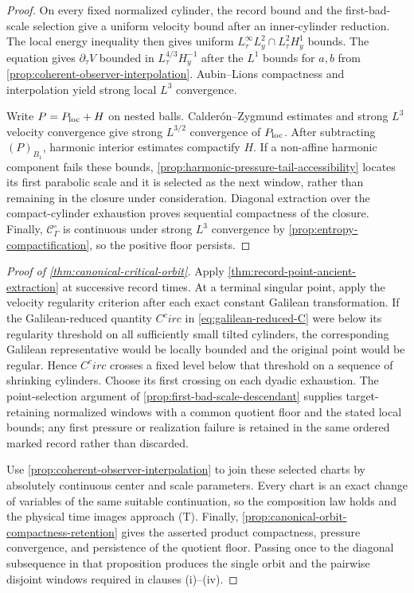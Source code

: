 \documentclass[11pt]{amsart}
\numberwithin{equation}{section}
\theoremstyle{plain}
\theoremstyle{definition}
\theoremstyle{remark}
\newcommand{\OscMass}{\mathcal C^{\circ}}
\begin{document}
\begin{proof}
On every fixed normalized cylinder, the record bound and the first-bad-scale
selection give a uniform velocity bound after an inner-cylinder reduction.
The local energy inequality then gives uniform
\(L^\infty_\tau L^2_y\cap L^2_\tau H^1_y\) bounds.  The equation gives
\(\partial_\tau V\) bounded in
\(L^{4/3}_\tau H^{-1}_y\) after the \(L^1\) bounds for \(a,b\) from
\cref{prop:coherent-observer-interpolation}.  Aubin--Lions compactness and
interpolation yield strong local \(L^3\) convergence.

Write \(P=P_{\rm loc}+H\) on nested balls.  Calder\'on--Zygmund estimates and
strong \(L^3\) velocity convergence give strong \(L^{3/2}\) convergence of
\(P_{\rm loc}\).  After subtracting \((P)_{B_1}\), harmonic interior
estimates compactify \(H\).  If a non-affine harmonic component fails these
bounds, \cref{prop:harmonic-pressure-tail-accessibility} locates its first
parabolic scale and it is selected as the next window, rather than remaining
in the closure under consideration.  Diagonal extraction over the
compact-cylinder exhaustion proves sequential compactness of the closure.
Finally, \(\OscMass_\Gamma\) is continuous under strong \(L^3\) convergence
by \cref{prop:entropy-compactification}, so the positive floor persists.
\end{proof}

\begin{proof}[Proof of \cref{thm:canonical-critical-orbit}]
Apply \cref{thm:record-point-ancient-extraction} at successive record times.
At a terminal singular point, apply the velocity regularity criterion after
each exact constant Galilean transformation.  If the Galilean-reduced
quantity \(C^circ\) in \eqref{eq:galilean-reduced-C} were below its regularity
threshold on all sufficiently small tilted cylinders, the corresponding
Galilean representative would be locally bounded and the original point
would be regular.  Hence \(C^circ\) crosses a fixed level below that threshold
on a sequence of shrinking cylinders.  Choose its first crossing on each
dyadic exhaustion.  The point-selection argument of
\cref{prop:first-bad-scale-descendant} supplies target-retaining normalized
windows with a common quotient floor and the stated local bounds; any first
pressure or realization failure is retained in the same ordered marked
record rather than discarded.

Use \cref{prop:coherent-observer-interpolation} to join these selected charts
by absolutely continuous center and scale parameters.  Every chart is an
exact change of variables of the same suitable continuation, so the
composition law holds and the physical time images approach (T).  Finally,
\cref{prop:canonical-orbit-compactness-retention} gives the asserted product
compactness, pressure convergence, and persistence of the quotient floor.
Passing once to the diagonal subsequence in that proposition produces the
single orbit and the pairwise disjoint windows required in clauses
\textup{(i)}--\textup{(iv)}.
\end{proof}
\end{document}
